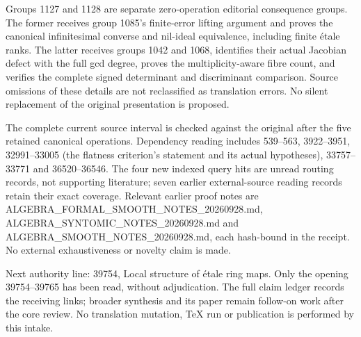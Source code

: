 Groups 1127 and 1128 are separate zero-operation editorial consequence groups. The former receives group 1085's finite-error lifting argument and proves the canonical infinitesimal converse and nil-ideal equivalence, including finite étale ranks. The latter receives groups 1042 and 1068, identifies their actual Jacobian defect with the full gcd degree, proves the multiplicity-aware fibre count, and verifies the complete signed determinant and discriminant comparison. Source omissions of these details are not reclassified as translation errors. No silent replacement of the original presentation is proposed.

The complete current source interval is checked against the original after the five retained canonical operations. Dependency reading includes 539--563, 3922--3951, 32991--33005 (the flatness criterion's statement and its actual hypotheses), 33757--33771 and 36520--36546. The four new indexed query hits are unread routing records, not supporting literature; seven earlier external-source reading records retain their exact coverage. Relevant earlier proof notes are ALGEBRA\_\allowbreak{}FORMAL\_\allowbreak{}SMOOTH\_\allowbreak{}NOTES\_\allowbreak{}20260928.\allowbreak{}md, ALGEBRA\_\allowbreak{}SYNTOMIC\_\allowbreak{}NOTES\_\allowbreak{}20260928.\allowbreak{}md and ALGEBRA\_\allowbreak{}SMOOTH\_\allowbreak{}NOTES\_\allowbreak{}20260928.\allowbreak{}md, each hash-bound in the receipt. No external exhaustiveness or novelty claim is made.

Next authority line: 39754, Local structure of étale ring maps. Only the opening 39754--39765 has been read, without adjudication. The full claim ledger records the receiving links; broader synthesis and its paper remain follow-on work after the core review. No translation mutation, TeX run or publication is performed by this intake.

